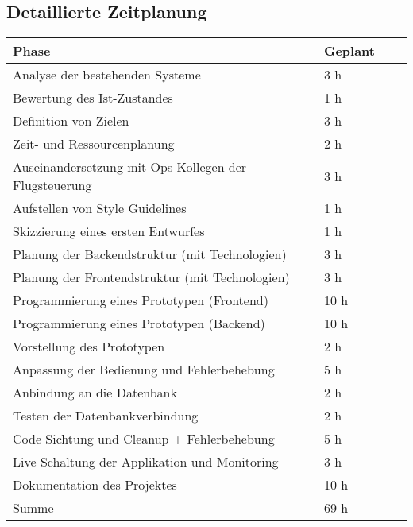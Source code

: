 \appendix
\renewcommand{\thesection}{\Alph{section}.\arabic{section}}
\setcounter{section}{0}

\begin{appendices}

	
\section{Detaillierte Zeitplanung}

\begin{table}[htp]

	\begin{center}
		\begin{tabular}{llll} \toprule
			Phase & Geplant \\ \bottomrule
			Analyse der bestehenden Systeme & 3 h \\
			Bewertung des Ist-Zustandes & 1 h \\
			Definition von Zielen & 3 h \\
			Zeit- und Ressourcenplanung & 2 h \\
			Auseinandersetzung mit Ops Kollegen der Flugsteuerung & 3 h \\
			Aufstellen von Style Guidelines & 1 h \\
			Skizzierung eines ersten Entwurfes & 1 h \\
			Planung der Backendstruktur (mit Technologien) & 3 h \\
			Planung der Frontendstruktur (mit Technologien) & 3 h \\
			Programmierung eines Prototypen (Frontend) & 10 h \\
			Programmierung eines Prototypen (Backend) & 10 h \\
			Vorstellung des Prototypen & 2 h \\
			Anpassung der Bedienung und Fehlerbehebung & 5 h \\
			Anbindung an die Datenbank & 2 h \\
			Testen der Datenbankverbindung & 2 h \\
			Code Sichtung und Cleanup + Fehlerbehebung & 5 h \\
			Live Schaltung der Applikation und Monitoring & 3 h \\
			Dokumentation des Projektes & 10 h \\ \bottomrule
		
			Summe & 69 h \\
		\end{tabular}
	\end{center}
\end{table}
\newpage





\end{appendices}
